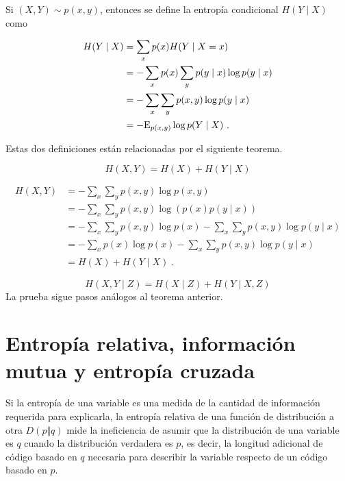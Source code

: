 
Si \((X,Y)\sim p(x,y)\), entonces se define la entropía condicional
\(H(Y\mid X)\) como

\begin{align}
  H(Y\mid X) &= \sum_{x}p(x)H(Y\mid X=x)\\
             &= -\sum_{x}p(x)\sum_{y}p(y\mid x) \log p(y \mid x)\\
             &= -\sum_{x}\sum_{y}p(x,y) \log p(y \mid x)\\
             &= -\mathrm{E}_{p(x,y)} \log p(Y \mid X)~.
\end{align}


Estas dos definiciones están relacionadas por el siguiente teorema.

\[H(X,Y)=H(X)+H(Y\mid X)\]

\proofb

\begin{align*}
  H(X,Y)&=-\sum_{x}\sum_{y}p(x,y)\log p(x,y)\\
        &=-\sum_{x}\sum_{y}p(x,y)\log\left(p(x)p(y\mid x)\right)\\
        &=-\sum_{x}\sum_{y}p(x,y)\log p(x) - \sum_{x}\sum_{y}p(x,y)\log p(y\mid x)\\
        &=-\sum_{x}p(x)\log p(x) - \sum_{x}\sum_{y}p(x,y)\log p(y\mid x)\\
        &=H(X)+H(Y\mid X)~.
\end{align*}

\proofe
\theoe

\corb
\[H(X,Y\mid Z)=H(X\mid Z)+H(Y\mid X,Z)\] \proofb
La prueba sigue pasos análogos al teorema anterior. \proofe
\core

\section{Entropía relativa, información mutua y entropía
cruzada}\label{entropuxeda-relativa-informaciuxf3n-mutua-y-entropuxeda-cruzada}

Si la entropía de una variable es una medida de la cantidad de
información requerida para explicarla, la entropía relativa de una
función de distribución a otra \(D(p\Vert q)\) mide la ineficiencia de
asumir que la distribución de una variable es \(q\) cuando la
distribución verdadera es \(p\), es decir, la longitud adicional de
código basado en \(q\) necesaria para describir la variable respecto de
un código basado en \(p\).

